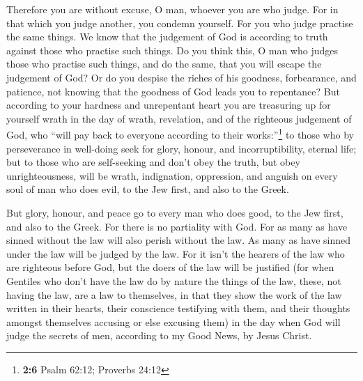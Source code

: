  Therefore you are without excuse, O man, whoever you are
who judge. For in that which you judge another, you condemn yourself.
For you who judge practise the same things.  We know that
the judgement of God is according to truth against those who practise
such things.  Do you think this, O man who judges those
who practise such things, and do the same, that you will escape the
judgement of God?  Or do you despise the riches of his
goodness, forbearance, and patience, not knowing that the goodness of
God leads you to repentance?  But according to your
hardness and unrepentant heart you are treasuring up for yourself wrath
in the day of wrath, revelation, and of the righteous judgement of God,
 who ``will pay back to everyone according to their
works:''\footnote{\textbf{2:6} Psalm 62:12; Proverbs 24:12}
 to those who by perseverance in well-doing seek for
glory, honour, and incorruptibility, eternal life;  but to
those who are self-seeking and don't obey the truth, but obey
unrighteousness, will be wrath, indignation,  oppression,
and anguish on every soul of man who does evil, to the Jew first, and
also to the Greek.

 But glory, honour, and peace go to every man who does
good, to the Jew first, and also to the Greek.  For there
is no partiality with God.  For as many as have sinned
without the law will also perish without the law. As many as have sinned
under the law will be judged by the law.  For it isn't
the hearers of the law who are righteous before God, but the doers of
the law will be justified  (for when Gentiles who don't
have the law do by nature the things of the law, these, not having the
law, are a law to themselves,  in that they show the work
of the law written in their hearts, their conscience testifying with
them, and their thoughts amongst themselves accusing or else excusing
them)  in the day when God will judge the secrets of men,
according to my Good News, by Jesus Christ.

